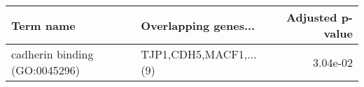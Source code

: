 \begin{tabular}{llr}
\toprule
                    Term name &   Overlapping genes... &  Adjusted p-value \\
\midrule
cadherin binding (GO:0045296) & TJP1,CDH5,MACF1,...(9) &          3.04e-02 \\
\bottomrule
\end{tabular}
